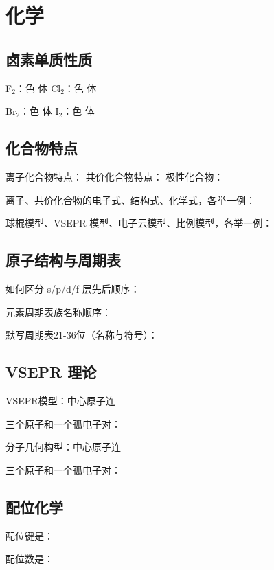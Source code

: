 \section{化学}

\subsection{卤素单质性质}
F$_2$：\sbl 色 \sbl 体 \quad 
Cl$_2$：\sbl 色 \sbl 体

Br$_2$：\sbl 色 \sbl 体 \quad 
I$_2$：\sbl 色 \sbl 体

\subsection{化合物特点}
离子化合物特点：\mbl \quad 
共价化合物特点：\mbl \quad 
极性化合物：\mbl

离子、共价化合物的电子式、结构式、化学式，各举一例：

球棍模型、VSEPR 模型、电子云模型、比例模型，各举一例：

\subsection{原子结构与周期表}
如何区分 s/p/d/f 层先后顺序：

元素周期表族名称顺序：

默写周期表21-36位（名称与符号）：
\subsection{VSEPR 理论}
VSEPR模型：中心原子连



三个原子和一个孤电子对：\mbl

分子几何构型：中心原子连



三个原子和一个孤电子对：\mbl

\subsection{配位化学}
配位键是：

配位数是：

